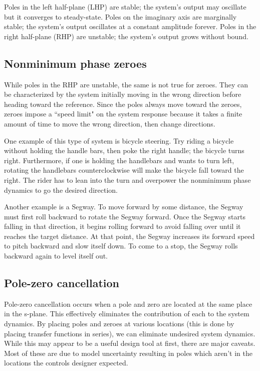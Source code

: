 Poles in the left half-plane (LHP) are stable; the \gls{system}'s output may
oscillate but it converges to steady-state. Poles on the imaginary axis are
marginally stable; the \gls{system}'s output oscillates at a constant amplitude
forever. Poles in the right half-plane (RHP) are unstable; the \gls{system}'s
output grows without bound.

\subsection{Nonminimum phase zeroes}

While poles in the RHP are unstable, the same is not true for zeroes. They can
be characterized by the \gls{system} initially moving in the wrong direction
before heading toward the \gls{reference}. Since the poles always move toward
the zeroes, zeroes impose a ``speed limit" on the \gls{system response} because
it takes a finite amount of time to move the wrong direction, then change
directions.

One example of this type of \gls{system} is bicycle steering. Try riding a
bicycle without holding the handle bars, then poke the right handle; the bicycle
turns right. Furthermore, if one is holding the handlebars and wants to turn
left, rotating the handlebars counterclockwise will make the bicycle fall toward
the right. The rider has to lean into the turn and overpower the nonminimum
phase dynamics to go the desired direction.

Another example is a Segway. To move forward by some distance, the Segway must
first roll backward to rotate the Segway forward. Once the Segway starts falling
in that direction, it begins rolling forward to avoid falling over until
it reaches the target distance. At that point, the Segway increases its forward
speed to pitch backward and slow itself down. To come to a stop, the Segway
rolls backward again to level itself out.

\subsection{Pole-zero cancellation}
\label{subsec:pole-zero_cancellation}

Pole-zero cancellation occurs when a pole and zero are located at the same place
in the s-plane. This effectively eliminates the contribution of each to the
\gls{system} dynamics. By placing poles and zeroes at various locations (this is
done by placing transfer functions in series), we can eliminate undesired
\gls{system} dynamics. While this may appear to be a useful design tool at
first, there are major caveats. Most of these are due to \gls{model} uncertainty
resulting in poles which aren't in the locations the controls designer expected.

